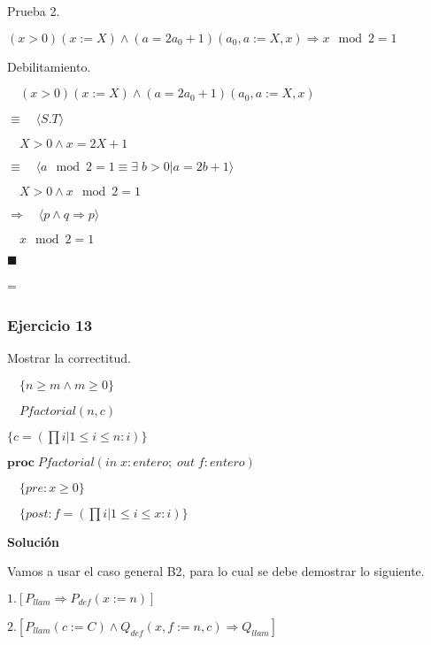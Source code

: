 \documentclass[hidelinks]{article}
\newenvironment{absolutelynopagebreak}
{\par\nobreak\vfil\penalty0\vfilneg
	\vtop\bgroup}
{\par\xdef\tpd{\the\prevdepth}\egroup
	\prevdepth=\tpd}
\begin{document}
\begin{absolutelynopagebreak}
	Prueba 2.\par
	$(x > 0)(x := X) \land (a = 2a_0 + 1)(a_0, a := X, x) \Rightarrow x \mod 2 = 1$\par

	Debilitamiento.\par
	$\quad (x > 0)(x := X) \land (a = 2a_0 + 1)(a_0, a := X, x)$\par
	$\equiv \quad \langle S.T \rangle$\par
	$\quad X > 0 \land x = 2X + 1$\par
	$\equiv \quad \langle a \mod 2 = 1 \equiv \exists \; b > 0 | a = 2b + 1  \rangle$\par
	$\quad X > 0 \land x \mod 2 = 1$\par
	$\Rightarrow \quad \langle p \land q \Rightarrow p  \rangle$\par
	$\quad x \mod 2 = 1$\par
	$\blacksquare$\par
\end{absolutelynopagebreak}

\newpage

\subsubsection{Ejercicio 13}


Mostrar la correctitud.\par

$\quad \{n \geq m \land m \geq 0\}$ \par
$\quad Pfactorial(n,c)$ \par
$\{ c = (\prod i| 1 \leq i \leq n : i)\}$ \par

$\textbf{proc} \; Pfactorial(in \; x: entero; \; out \; f: entero)$ \par
$\quad \{pre: x \geq 0\}$ \par
$\quad \{post: f = (\prod i| 1 \leq i \leq x: i)\}$\par

\textbf{Solución}\par

Vamos a usar el caso general B2, para lo cual se debe demostrar lo siguiente.\par
$1. [P_{llam} \Rightarrow P_{def}(x := n)]$\par
$2. [P_{llam}(c := C) \land Q_{def}(x,f := n,c) \Rightarrow Q_{llam}]$\par
\end{document}
